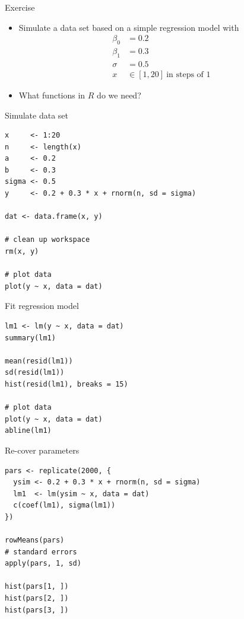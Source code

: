 \documentclass[aspectratio=169]{beamer}
\begin{document}
\begin{frame}{}
  \begin{block}{Exercise}
    \begin{itemize}
      \item Simulate a data set based on a simple regression model with
        \begin{align*}
          \beta_0 & = 0.2\\
          \beta_1 & = 0.3\\
          \sigma & = 0.5\\
          x & \in [1, 20]~\text{in steps of 1}
        \end{align*}
        \vspace{-.5cm}
      \item What functions in $R$ do we need?
    \end{itemize}
  \end{block}
\end{frame}

\begin{frame}[fragile]{Simulate data set}
\begin{lstlisting}
x     <- 1:20
n     <- length(x)
a     <- 0.2
b     <- 0.3
sigma <- 0.5
y     <- 0.2 + 0.3 * x + rnorm(n, sd = sigma)

dat <- data.frame(x, y)

# clean up workspace
rm(x, y)

# plot data
plot(y ~ x, data = dat)
\end{lstlisting}
  \nocite{GelmanHill2020}
\end{frame}

\begin{frame}[fragile]{Fit regression model}
\begin{lstlisting}
lm1 <- lm(y ~ x, data = dat)
summary(lm1)

mean(resid(lm1))
sd(resid(lm1))
hist(resid(lm1), breaks = 15)

# plot data
plot(y ~ x, data = dat)
abline(lm1)
\end{lstlisting}
\end{frame}

\begin{frame}[fragile]{Re-cover parameters}
\begin{lstlisting}
pars <- replicate(2000, {
  ysim <- 0.2 + 0.3 * x + rnorm(n, sd = sigma)
  lm1  <- lm(ysim ~ x, data = dat)
  c(coef(lm1), sigma(lm1))
})

rowMeans(pars)
# standard errors
apply(pars, 1, sd)

hist(pars[1, ])
hist(pars[2, ])
hist(pars[3, ])
\end{lstlisting}
\end{frame}
\end{document}
